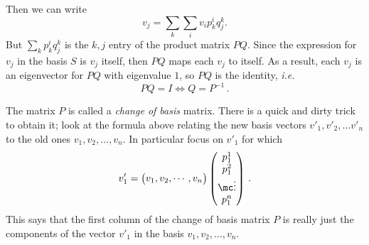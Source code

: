 Then we can write
\[
v_j = \sum_k \sum_i v_ip^i_kq^k_j.
\]
But $\sum_k p^i_kq^k_j$ is the $k,j$ entry of the product matrix  $PQ$.  Since the  expression for $v_j$ in the basis $S$ is $v_j$ itself, then $PQ$ maps each  $v_j$ to itself.  As a result, each $v_j$ is an eigenvector for $PQ$ with eigenvalue $1$, so $PQ$ is the identity, {\itshape i.e.}
\[
PQ=I \Leftrightarrow Q=P^{-1}\, .
\]

\vspace{1mm}
The matrix $P$ is  called a \emph{change of basis} matrix. There is a quick and dirty trick to obtain it; look at the formula above relating the new basis vectors
$v'_1,v'_2,\ldots v'_n$ to the old ones $v_1,v_2,\ldots,v_n$. In particular focus on $v'_1$ for which
\[
v'_1= \begin{pmatrix}v_1 , v_2 , \cdots , v_n\end{pmatrix}
\begin{pmatrix}p^1_1\\p^2_1\\\mc\vdots \\ p^n_1
\end{pmatrix}\, .
\]
This says that the first column of the change of basis matrix $P$ is really just the components of the vector $v'_1$ in the basis $v_1,v_2,\ldots,v_n$. 


